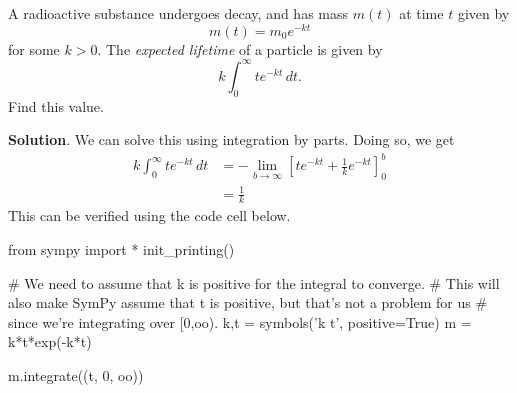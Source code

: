 \documentclass[10pt,]{book}
\theoremstyle{ptxplainnotitle}
\theoremstyle{ptxplaintitle}
\theoremstyle{ptxplainnotitle}
\theoremstyle{ptxplaintitle}
\theoremstyle{ptxplainnotitle}
\theoremstyle{ptxplaintitle}
\theoremstyle{ptxdefinitionnotitle}
\theoremstyle{ptxdefinitiontitle}
\theoremstyle{ptxdefinitionnotitle}
\theoremstyle{ptxdefinitiontitle}
\theoremstyle{ptxdefinitionnotitle}
\theoremstyle{ptxdefinitiontitle}
\theoremstyle{ptxdefinitionnotitle}
\theoremstyle{ptxdefinitiontitle}
\theoremstyle{ptxdefinitionnotitle}
\theoremstyle{ptxdefinitiontitle}
\numberwithin{equation}{section}
\newcommand{\gt}{>}
\begin{document}
\begin{example}\label{example-radioactive-decay}
\hypertarget{p-592}{}%
A radioactive substance undergoes decay, and has mass \(m(t)\) at time \(t\) given by%
\begin{equation*}
m(t) = m_{0}e^{-kt}
\end{equation*}
for some \(k\gt0\). The \emph{expected lifetime} of a particle is given by%
\begin{equation*}
k\int_{0}^{\infty}te^{-kt}\,dt.
\end{equation*}
Find this value.%
\par\smallskip%
\noindent\textbf{Solution}.\hypertarget{solution-128}{}\quad%
\hypertarget{p-593}{}%
We can solve this using integration by parts. Doing so, we get%
\begin{align*}
k\int_{0}^{\infty}te^{-kt}\,dt & = -\lim_{b\to\infty}\left[te^{-kt} + \frac{1}{k}e^{-kt}\right]_{0}^{b} \\
& = \frac{1}{k} 
\end{align*}
This can be verified using the code cell below.%
\end{example}
\begin{sageinput}
from sympy import *
init_printing()

# We need to assume that k is positive for the integral to converge.
# This will also make SymPy assume that t is positive, but that's not a problem for us
# since we're integrating over [0,oo).
k,t = symbols('k t', positive=True)
m = k*t*exp(-k*t)

m.integrate((t, 0, oo))
\end{sageinput}
\typeout{************************************************}
\typeout{************************************************}
\end{document}
